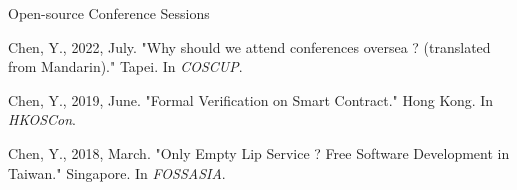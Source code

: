 \begin{cventries}
\cventry
{} %
{Open-source Conference Sessions} %
{} %
{} %
{
  \vspace{-2mm}
  \begin{cvitems} %
    \item {Chen, Y., 2022, July. "Why should we attend conferences oversea ? (translated from Mandarin)." Tapei.
    In \emph{COSCUP}.
    }
    \item {Chen, Y., 2019, June. "Formal Verification on Smart Contract." Hong Kong.
    In \emph{HKOSCon}.
    }
    \item {Chen, Y., 2018, March. "Only Empty Lip Service ? Free Software Development in Taiwan." Singapore.
    In \emph{FOSSASIA}.
    }
  \end{cvitems}
}
\vspace{-2mm}  

\end{cventries}
